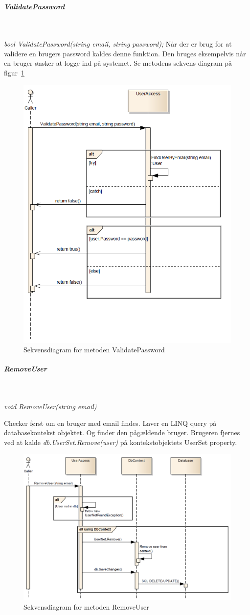 \subparagraph{ValidatePassword}\

\textit{bool ValidatePassword(string email, string password);}
Når der er brug for at validere en brugers password kaldes denne funktion. Den bruges eksempelvis når en bruger ønsker at logge ind på systemet. Se metodens sekvens diagram på figur~\ref{fig:validatePassword}
	
\begin{figure}
\centering
\includegraphics[width=0.7\linewidth]{figs/dbSeq/validatePassword.PNG}
\caption{Sekvensdiagram for metoden ValidatePassword}
\label{fig:validatePassword}
\end{figure}


\subparagraph{RemoveUser}\

\textit{void RemoveUser(string email)}

Checker først om en bruger med email findes.
Laver en LINQ query på databasekontekst objektet. Og finder den pågældende bruger.
Brugeren fjernes ved at kalde \textit{db.UserSet.Remove(user)} på kontekstobjektets UserSet property.

\begin{figure}
\centering
\includegraphics[width=0.7\linewidth]{figs/dbSeq/removeUser.PNG}
\caption{Sekvensdiagram for metoden RemoveUser}
\label{fig:removeUser}
\end{figure}



